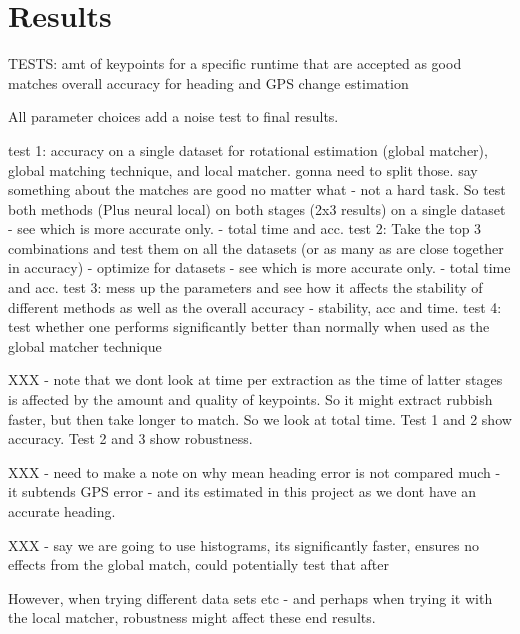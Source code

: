 

    







\chapter{Results}

TESTS:
amt of keypoints for a specific runtime that are accepted as good matches
overall accuracy for heading and GPS change estimation



All parameter choices
add a noise test to final results. 




test 1: accuracy on a single dataset for rotational estimation (global matcher), global matching technique, and local matcher. gonna need to split those. say something about the matches are good no matter what  - not a hard task.
So test both methods (Plus neural local) on both stages (2x3 results) on a single dataset - see which is more accurate only. - total time and acc.
test 2: Take the top 3 combinations and test them on all the datasets (or as many as are close together in accuracy) - optimize for datasets - see which is more accurate only. - total time and acc. 
test 3: mess up the parameters and see how it affects the stability of different methods as well as the overall accuracy - stability, acc and time. 
test 4: test whether one performs significantly better than normally when used as the global matcher technique

XXX - note that we dont look at time per extraction as the time of latter stages is affected by the amount and quality of keypoints. So it might extract rubbish faster, but then take longer to match. So we look at total time.
Test 1 and 2 show accuracy. Test 2 and 3 show robustness. 

XXX - need to make a note on why mean heading error is not compared much - it subtends GPS error - and its estimated in this project as we dont have an accurate heading. 

XXX - say we are going to use histograms, its significantly faster, ensures no effects from the global match, could potentially test that after 





However, when trying different data sets etc - and perhaps when trying it with the local matcher, robustness might affect these end results. 

